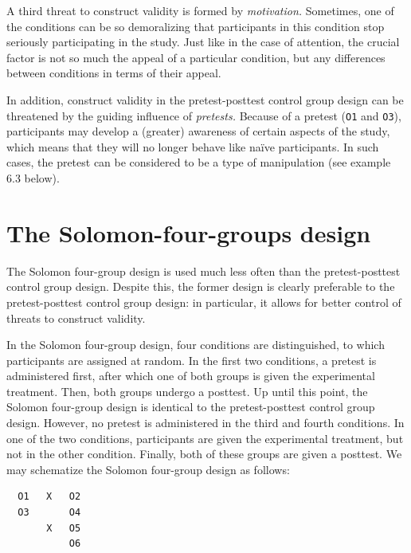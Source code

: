 \documentclass[
]{book}
\begin{document}
A third threat to construct validity is formed by \emph{motivation.} Sometimes, one of the conditions can be so demoralizing that participants in this condition stop seriously participating in the study. Just like in the case of attention, the crucial factor is not so much the appeal of a particular condition, but any differences between conditions in terms of their appeal.

In addition, construct validity in the pretest-posttest control group design can be threatened by the guiding influence of \emph{pretests.} Because of a pretest (\texttt{O1} and \texttt{O3}), participants may develop a (greater) awareness of certain aspects of the study, which means that they will no longer behave like naïve participants. In such cases, the pretest can be considered to be a type of manipulation (see example 6.3 below).

\hypertarget{sec:solomon-four-groups-design}{%
\section{The Solomon-four-groups design}\label{sec:solomon-four-groups-design}}

The Solomon four-group design is used much less often than the pretest-posttest control group design. Despite this, the former design is clearly preferable to the pretest-posttest control group design: in particular, it allows for better control of threats to construct validity.

In the Solomon four-group design, four conditions are distinguished, to which participants are assigned at random. In the first two conditions, a pretest is administered first, after which one of both groups is given the experimental treatment. Then, both groups undergo a posttest. Up until this point, the Solomon four-group design is identical to the pretest-posttest control group design. However, no pretest is administered in the third and fourth conditions. In one of the two conditions, participants are given the experimental treatment, but not in the other condition. Finally, both of these groups are given a posttest. We may schematize the Solomon four-group design as follows:

\begin{verbatim}
  O1   X   O2
  O3       O4
       X   O5
           O6
\end{verbatim}
\end{document}
